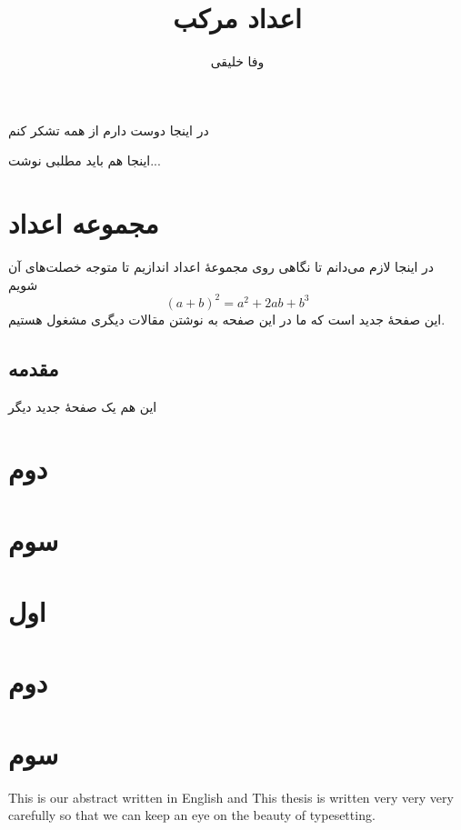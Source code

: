 \documentclass[a4paper,11pt]{xepersian-thesis}
\begin{document}
\title{اعداد مرکب}
\author{وفا خلیقی}
\thesisdate{\today}
\maketitle
\begin{acknowledgementpage}
در اینجا دوست دارم از همه تشکر کنم
\end{acknowledgementpage}
\begin{abstractpage}
اینجا هم باید مطلبی نوشت...
\end{abstractpage}
\tableofcontents
\listoftables
\chapter{مجموعه اعداد}
در اینجا لازم می‌دانم تا نگاهی روی مجموعهٔ اعداد اندازیم تا متوجه خصلت‌های آن شویم
\begin{equation}
(a+b)^2=a^2+2ab+b^3
\end{equation}
\newpage
این صفحهٔ جدید است که ما در این صفحه به نوشتن مقالات دیگری مشغول هستیم.
\section{مقدمه}

\newpage
این هم یک صفحهٔ جدید دیگر
\chapter{دوم}
\chapter{سوم}
\appendix
\chapter{اول}
\chapter{دوم}
\chapter{سوم}

\begin{thebibliography}{99}
\end{thebibliography}
\begin{roman}
\romanthesisdate{\romantoday}
\begin{romanabstract}
\noindent This is our abstract written in English and This thesis is written very very very carefully so that we can keep  an eye on the beauty of typesetting.
\end{romanabstract}
\makeromantitle
\end{roman}
\end{document}
